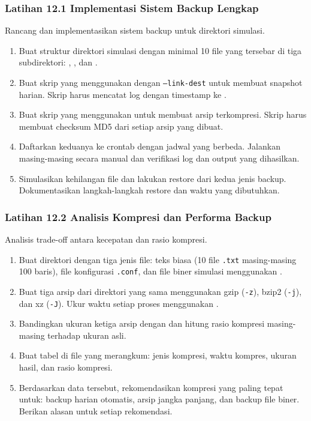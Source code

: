 \subsubsection*{Latihan 12.1 Implementasi Sistem Backup Lengkap}
Rancang dan implementasikan sistem backup untuk direktori simulasi.
\begin{enumerate}
    \item Buat struktur direktori simulasi dengan minimal 10 file yang tersebar
        di tiga subdirektori: , , dan .
    \item Buat skrip  yang menggunakan  dengan
        \texttt{--link-dest} untuk membuat snapshot harian. Skrip harus mencatat
        log dengan timestamp ke .
    \item Buat skrip  yang menggunakan 
        untuk membuat arsip terkompresi. Skrip harus membuat checksum MD5 dari
        setiap arsip yang dibuat.
    \item Daftarkan keduanya ke crontab dengan jadwal yang berbeda. Jalankan
        masing-masing secara manual dan verifikasi log dan output yang dihasilkan.
\item Simulasikan kehilangan file dan lakukan restore dari kedua jenis backup.
        Dokumentasikan langkah-langkah restore dan waktu yang dibutuhkan.
\end{enumerate}

\subsubsection*{Latihan 12.2 Analisis Kompresi dan Performa Backup}
Analisis trade-off antara kecepatan dan rasio kompresi.
\begin{enumerate}
    \item Buat direktori dengan tiga jenis file: teks biasa (10 file \texttt{.txt}
        masing-masing 100 baris), file konfigurasi \texttt{.conf}, dan file biner
        simulasi menggunakan .
    \item Buat tiga arsip dari direktori yang sama menggunakan gzip (\texttt{-z}),
        bzip2 (\texttt{-j}), dan xz (\texttt{-J}). Ukur waktu setiap proses
        menggunakan .
    \item Bandingkan ukuran ketiga arsip dengan  dan hitung rasio
        kompresi masing-masing terhadap ukuran asli.
    \item Buat tabel di file  yang merangkum: jenis
        kompresi, waktu kompres, ukuran hasil, dan rasio kompresi.
\item Berdasarkan data tersebut, rekomendasikan kompresi yang paling tepat
        untuk: backup harian otomatis, arsip jangka panjang, dan backup file biner.
        Berikan alasan untuk setiap rekomendasi.
\end{enumerate}

